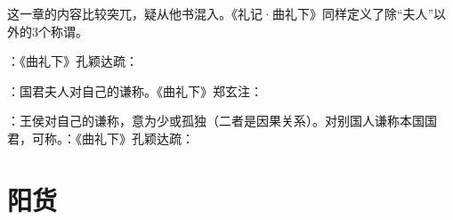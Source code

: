 {
这一章的内容比较突兀，疑从他书混入。《礼记·曲礼下》同样定义了除“夫人”以外的3个称谓。
\begin{lyblobitemize}
\item {}：《曲礼下》孔颖达疏：
\item {}：国君夫人对自己的谦称。《曲礼下》郑玄注：
\item {}：王侯对自己的谦称，意为少或孤独（二者是因果关系）。对别国人谦称本国国君，可称。：《曲礼下》孔颖达疏：
\end{lyblobitemize}
}
{}


\chapter{阳货}

